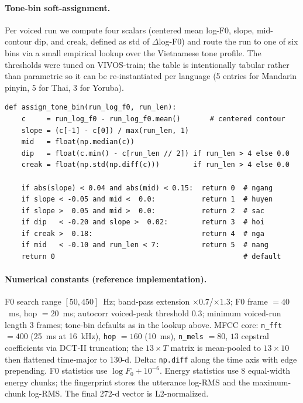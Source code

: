 \documentclass[a4paper,fleqn]{cas-dc}
\begin{document}
\paragraph{Tone-bin soft-assignment.} Per voiced run we compute four scalars (centered mean log-F0, slope, mid-contour dip, and creak, defined as std of $\Delta$log-F0) and route the run to one of six bins via a small empirical lookup over the Vietnamese tone profile. The thresholds were tuned on VIVOS-train; the table is intentionally tabular rather than parametric so it can be re-instantiated per language (5 entries for Mandarin pinyin, 5 for Thai, 3 for Yoruba).

{\footnotesize\begin{verbatim}
def assign_tone_bin(run_log_f0, run_len):
    c     = run_log_f0 - run_log_f0.mean()       # centered contour
    slope = (c[-1] - c[0]) / max(run_len, 1)
    mid   = float(np.median(c))
    dip   = float(c.min() - c[run_len // 2]) if run_len > 4 else 0.0
    creak = float(np.std(np.diff(c)))        if run_len > 4 else 0.0

    if abs(slope) < 0.04 and abs(mid) < 0.15:  return 0  # ngang
    if slope < -0.05 and mid <  0.0:           return 1  # huyen
    if slope >  0.05 and mid >  0.0:           return 2  # sac
    if dip   < -0.20 and slope >  0.02:        return 3  # hoi
    if creak >  0.18:                          return 4  # nga
    if mid   < -0.10 and run_len < 7:          return 5  # nang
    return 0                                             # default
\end{verbatim}}

\paragraph{Numerical constants (reference implementation).} F0 search range $[50, 450]$~Hz; band-pass extension $\times 0.7$/$\times 1.3$; F0 frame $= 40$~ms, hop $= 20$~ms; autocorr voiced-peak threshold $0.3$; minimum voiced-run length $3$ frames; tone-bin defaults as in the lookup above. MFCC core: \texttt{n\_fft} $= 400$ (25~ms at 16~kHz), \texttt{hop} $= 160$ (10~ms), \texttt{n\_mels} $= 80$, $13$ cepstral coefficients via DCT-II truncation; the $13 \times T$ matrix is mean-pooled to $13 \times 10$ then flattened time-major to 130-d. Delta: \texttt{np.diff} along the time axis with edge prepending. F0 statistics use $\log F_0 + 10^{-6}$. Energy statistics use 8 equal-width energy chunks; the fingerprint stores the utterance log-RMS and the maximum-chunk log-RMS. The final 272-d vector is L2-normalized.
\end{document}
